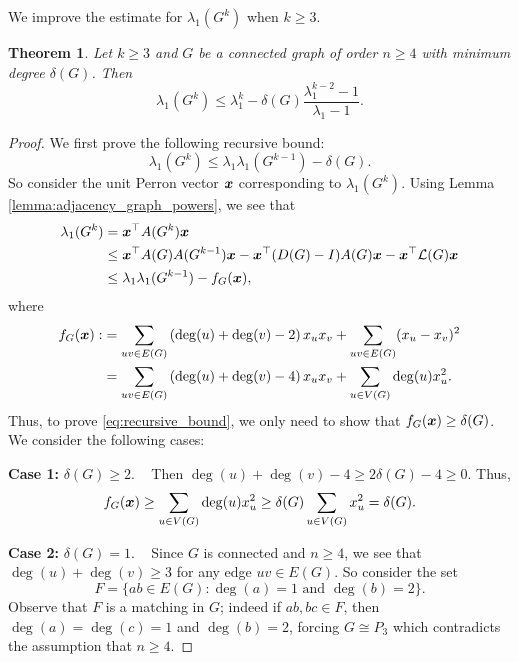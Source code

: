 \documentclass[10pt,a4paper]{article}
\theoremstyle{plain}
\newtheorem{theorem}{Theorem}[section]
\numberwithin{equation}{section}
\def\x{\mbox{\boldmath $x$}}
\begin{document}
We improve the estimate for $\lambda_1(G^k)$ when $k\ge 3$.


\begin{theorem}\label{thm:spectral_radius_higher_power}
Let $k\ge 3$ and $G$ be a connected graph of order $n\ge 4$ with minimum degree $\delta(G)$. Then 
\[\lambda_1(G^k) \le \lambda_1^k - \delta(G)\frac{\lambda_1^{k-2}-1}{\lambda_1 -1}.\]
\end{theorem} 



\begin{proof} 
    We first prove the following recursive bound:
    \begin{equation}\label{eq:recursive_bound}
        \lambda_1(G^k)\le \lambda_1 \lambda_1(G^{k-1}) - \delta(G).
    \end{equation}
    So consider the unit Perron vector $\x$ corresponding to $\lambda_1(G^k)$. Using Lemma \ref{lemma:adjacency_graph_powers}, we see that 
    \begin{align*}
        \lambda_1(G^k) 
        & = \x^\top A(G^k) \x \\
        & \le \x^\top A(G)A(G^{k-1})\x - \x^\top (D(G)-I)A(G)\x - \x^\top \mathcal{L}(G)\x\\
        & \le \lambda_1\lambda_1(G^{k-1}) - f_G(\x), 
    \end{align*}
    where 
    \begin{align*}
      f_G(\x):& = \sum_{uv\in E(G)} \left(\deg(u)+\deg(v)-2\right)x_ux_v + \sum_{uv\in E(G)} (x_u-x_v)^2 \\
      & = \sum_{uv\in E(G)} \left(\deg(u)+\deg(v)-4\right)x_ux_v + \sum_{u\in V(G)} \deg(u)x_u^2.
    \end{align*}
    Thus, to prove \eqref{eq:recursive_bound}, we only need to show that $f_G(\x)\ge \delta(G)$. We consider the following cases:

    \textbf{Case 1:} $\delta(G)\ge 2$. ~ Then $\deg(u)+\deg(v)-4\ge 2\delta(G)-4\ge 0$. Thus, 
    \[ f_G(\x) \ge \sum_{u\in V(G)} \deg(u)x_u^2 \ge \delta(G)\sum_{u\in V(G)}x_u^2  = \delta(G). \]

   \textbf{Case 2:} $\delta(G) = 1$. ~ Since $G$ is connected and $n\ge 4$, we see that $\deg(u) + \deg(v)\ge 3$ for any edge $uv\in E(G)$. So consider the set 
   \[F = \{ab\in E(G): \deg(a)=1 \text{ and }\deg(b) =2\}.\]
   Observe that $F$ is a matching in $G$; indeed if $ab, bc\in F$, then $\deg(a) = \deg(c) = 1$ and $\deg(b)=2$, forcing $G\cong P_3$ which contradicts the assumption that $n\ge 4$.  
   

\end{proof}
\end{document}
